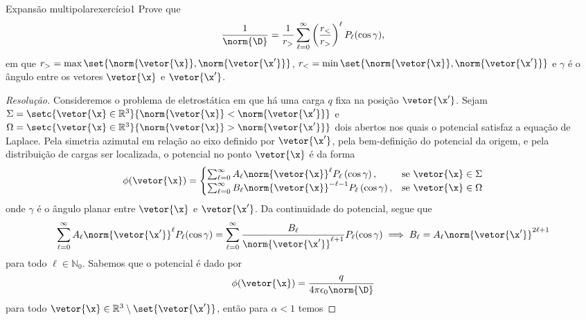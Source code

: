 \begin{exercício}{Expansão multipolar}{exercício1}
    Prove que
    \begin{equation*}
        \frac{1}{\norm{\D}} = \frac{1}{r_>} \sum_{\ell = 0}^\infty \left(\frac{r_<}{r_>}\right)^\ell P_\ell(\cos \gamma),
    \end{equation*}
    em que \(r_> = \max\set{\norm{\vetor{\x}}, \norm{\vetor{\x'}}}\), \(r_< = \min\set{\norm{\vetor{\x}}, \norm{\vetor{\x'}}}\) e \(\gamma\) é o ângulo entre os vetores \(\vetor{\x}\) e \(\vetor{\x'}\).
\end{exercício}
\begin{proof}[Resolução]
    Consideremos o problema de eletrostática em que há uma carga \(q\) fixa na posição \(\vetor{\x'}\). Sejam \(\Sigma = \setc{\vetor{\x} \in \mathbb{R}^3}{\norm{\vetor{\x}} < \norm{\vetor{\x'}}}\) e \(\Omega = \setc{\vetor{\x} \in \mathbb{R}^3}{\norm{\vetor{\x}} > \norm{\vetor{\x'}}}\) dois abertos nos quais o potencial satisfaz a equação de Laplace. Pela simetria azimutal em relação ao eixo definido por \(\vetor{\x'}\), pela bem-definição do potencial da origem, e pela distribuição de cargas ser localizada, o potencial no ponto \(\vetor{\x}\) é da forma
    \begin{equation*}
        \phi(\vetor{\x}) = \begin{cases}
            \sum_{\ell = 0}^\infty A_\ell \norm{\vetor{\x}}^\ell P_{\ell}\left(\cos\gamma\right),&\text{se } \vetor{\x} \in \Sigma\\
            \sum_{\ell = 0}^\infty B_\ell\norm{\vetor{\x}}^{-\ell - 1} P_{\ell}\left(\cos\gamma\right),&\text{se } \vetor{\x} \in \Omega
        \end{cases}
    \end{equation*}
    onde \(\gamma\) é o ângulo planar entre \(\vetor{\x}\) e \(\vetor{\x'}\). Da continuidade do potencial, segue que
    \begin{equation*}
        \sum_{\ell = 0}^\infty A_\ell \norm{\vetor{\x'}}^\ell P_\ell(\cos \gamma) = \sum_{\ell = 0}^\infty \frac{B_\ell}{\norm{\vetor{\x'}}^{\ell + 1}} P_\ell(\cos\gamma) \implies B_{\ell} = A_\ell \norm{\vetor{\x'}}^{2\ell + 1}
    \end{equation*}
    para todo \(\ell \in \mathbb{N}_0\). Sabemos que o potencial é dado por
    \begin{equation*}
        \phi(\vetor{\x}) = \frac{q}{4\pi \epsilon_0 \norm{\D}}
    \end{equation*}
    para todo \(\vetor{\x} \in \mathbb{R}^3 \setminus \set{\vetor{\x'}}\), então para \(\alpha < 1\) temos

\end{proof}
